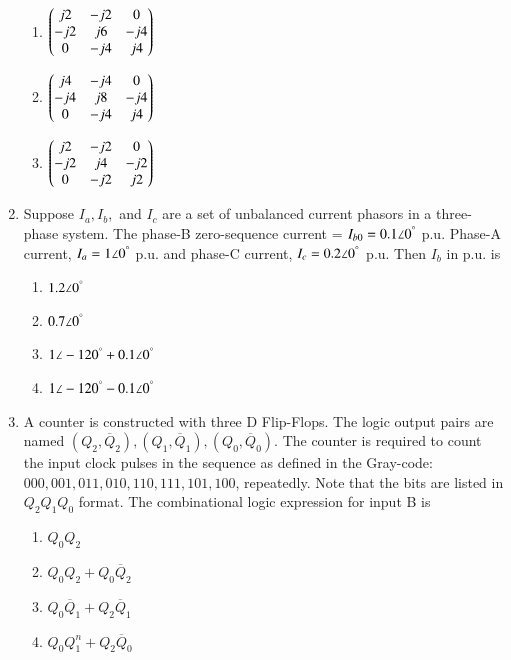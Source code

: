 \documentclass[journal,12pt,onecolumn]{IEEEtran}
\theoremstyle{remark}
\begin{document}
\begin{flushleft}
\begin{enumerate}
\begin{multicols}{2}
\begin{enumerate}
\item $\begin{pmatrix}
j2 & -j2 & 0 \\
-j2 & j6 & -j4 \\
0 & -j4 & j4
\end{pmatrix}$

\item $\begin{pmatrix}
j4 & -j4 & 0 \\
-j4 & j8 & -j4 \\
0 & -j4 & j4
\end{pmatrix}$

\item $\begin{pmatrix}
j2 & -j2 & 0 \\
-j2 & j4 & -j2 \\
0 & -j2 & j2
\end{pmatrix}$
\end{enumerate}
\end{multicols}


\item Suppose $I_a, I_b,$ and $I_c$ are a set of unbalanced current phasors in a three-phase system. 
The phase-B zero-sequence current = $I_{b0} = 0.1\angle 0^\degree$ p.u.  
Phase-A current, $I_a = 1\angle 0^\degree$ p.u. and phase-C current, $I_c = 0.2\angle 0^\degree$ p.u.  
Then $I_b$ in p.u. is 

\begin{multicols}{2}
\begin{enumerate}
\item $1.2 \angle 0^\degree$
\item $0.7 \angle 0^\degree$
\item $1 \angle -120^\degree + 0.1\angle 0^\degree$
\item $1 \angle -120^\degree - 0.1\angle 0^\degree$
\end{enumerate}
\end{multicols}

\item A counter is constructed with three D Flip-Flops. The logic output pairs are named $(Q_2,\overline{Q}_2), (Q_1,\overline{Q}_1), (Q_0,\overline{Q}_0)$. 
The counter is required to count the input clock pulses in the sequence as defined in the Gray-code: $000, 001, 011, 010, 110, 111, 101, 100$, repeatedly.  
Note that the bits are listed in $Q_2 Q_1 Q_0$ format.  
The combinational logic expression for input B is

\begin{multicols}{2}
\begin{enumerate}
\item $Q_0 Q_2$
\item $Q_0 Q_2 + Q_0 \overline{Q}_2$
\item $Q_0 \overline{Q}_1 + Q_2 \overline{Q}_1$
\item $Q_0 Q_1^n + Q_2 \overline{Q}_0$
\end{enumerate}
\end{multicols}



\end{enumerate}
\end{flushleft}
\end{document}
